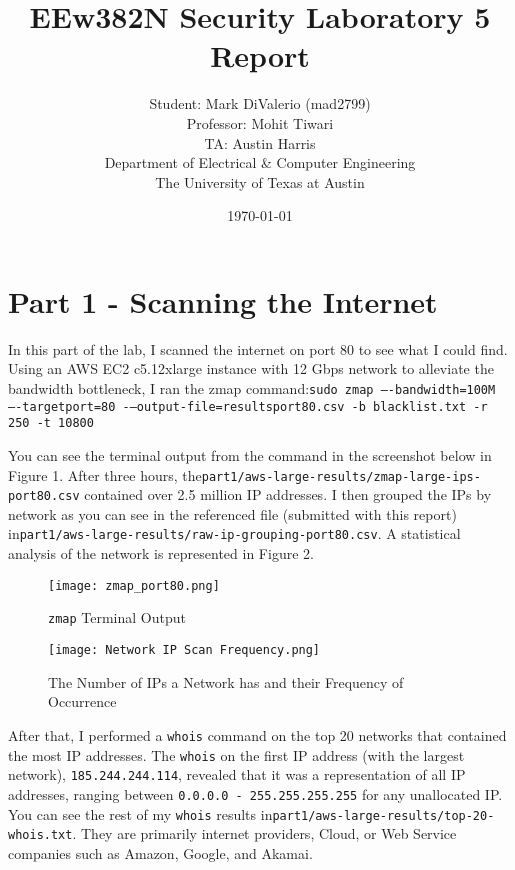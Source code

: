 \documentclass[11pt]{article}
\author{Student: Mark DiValerio (mad2799) \\ Professor: Mohit Tiwari \\ TA: Austin Harris \\ Department of Electrical \& Computer Engineering \\ The University of Texas at Austin}
\date{\AdvanceDate[-1]\today}
\title{EEw382N Security Laboratory 5 Report}
\def\code#1{\texttt{#1}}
\begin{document}
\maketitle
\section{Part 1 - Scanning the Internet}
\label{sec:question-1}

In this part of the lab, I scanned the internet on port 80 to see what I could find. Using an AWS EC2 c5.12xlarge instance with 12 Gbps network to alleviate the bandwidth bottleneck, I ran the zmap command:\newline\newline\code{sudo zmap –-bandwidth=100M –-target\textminus port=80 -–output-file=results\textunderscore port80.csv -b blacklist.txt -r 250 -t 10800}\newline

You can see the terminal output from the command in the screenshot below in Figure 1. After three hours, the\newline \code{part1/aws-large-results/zmap-large-ips-port80.csv} contained over 2.5 million IP addresses. I then grouped the IPs by network as you can see in the referenced file (submitted with this report) in\newline \code{part1/aws-large-results/raw-ip-grouping-port80.csv}. A statistical analysis of the network is represented in Figure 2.

\begin{figure}[H]
\centering
\texttt{[image: zmap\_port80.png]}
\caption{\code{zmap} Terminal Output}
\end{figure}

\begin{figure}[H]
\centering
\texttt{[image: Network IP Scan Frequency.png]}
\caption{The Number of IPs a Network has and their Frequency of Occurrence}
\end{figure}


After that, I performed a \code{whois} command on the top 20 networks that contained the most IP addresses. The \code{whois} on the first IP address (with the largest network), \code{185.244.244.114}, revealed that it was a representation of all IP addresses, ranging between \code{0.0.0.0 - 255.255.255.255} for any unallocated IP. You can see the rest of my \code{whois} results in\newline \code{part1/aws-large-results/top-20-whois.txt}. They are primarily internet providers, Cloud, or Web Service companies such as Amazon, Google, and Akamai.
\end{document}
